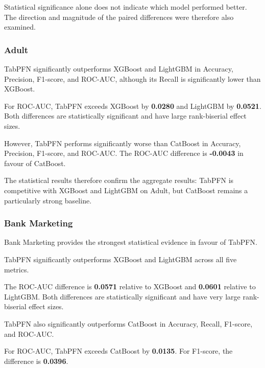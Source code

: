 Statistical significance alone does not indicate which model performed better. The direction and magnitude of the paired differences were therefore also examined.



\subsubsection{Adult}



TabPFN significantly outperforms XGBoost and LightGBM in Accuracy, Precision, F1-score, and ROC-AUC, although its Recall is significantly lower than XGBoost.



For ROC-AUC, TabPFN exceeds XGBoost by \textbf{0.0280} and LightGBM by \textbf{0.0521}. Both differences are statistically significant and have large rank-biserial effect sizes.



However, TabPFN performs significantly worse than CatBoost in Accuracy, Precision, F1-score, and ROC-AUC. The ROC-AUC difference is \textbf{-0.0043} in favour of CatBoost.



The statistical results therefore confirm the aggregate results: TabPFN is competitive with XGBoost and LightGBM on Adult, but CatBoost remains a particularly strong baseline.



\subsubsection{Bank Marketing}



Bank Marketing provides the strongest statistical evidence in favour of TabPFN.



TabPFN significantly outperforms XGBoost and LightGBM across all five metrics.



The ROC-AUC difference is \textbf{0.0571} relative to XGBoost and \textbf{0.0601} relative to LightGBM. Both differences are statistically significant and have very large rank-biserial effect sizes.



TabPFN also significantly outperforms CatBoost in Accuracy, Recall, F1-score, and ROC-AUC.



For ROC-AUC, TabPFN exceeds CatBoost by \textbf{0.0135}. For F1-score, the difference is \textbf{0.0396}.



